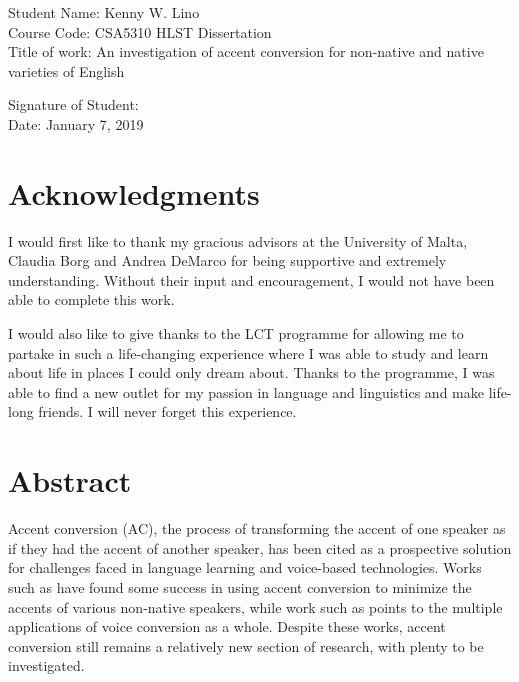 \documentclass
[
    a4paper,
    twoside,
    12pt,
]
{report}
\begin{document}
       \vspace*{1.5cm}
	     Student Name: Kenny W. Lino \\
       Course Code: CSA5310 HLST Dissertation \\
       Title of work: An investigation of accent conversion for non-native and native varieties of English\

       \vspace*{1.0cm}
       Signature of Student: \\

       \vspace*{1.0cm}
       Date: January 7, 2019

\newpage
\section*{Acknowledgments}

I would first like to thank my gracious advisors at the University of
Malta, Claudia Borg and Andrea DeMarco for being supportive and
extremely understanding. Without their input and encouragement, I would
not have been able to complete this work.

I would also like to give thanks to the LCT programme for allowing me to
partake in such a life-changing experience where I was able to study and
learn about life in places I could only dream about. Thanks to the
programme, I was able to find a new outlet for my passion in language
and linguistics and make life-long friends. I will never forget this
experience.

\newpage
\section*{Abstract}

Accent conversion (AC), the process of transforming the accent of one
speaker as if they had the accent of another speaker, has been cited as
a prospective solution for challenges faced in language learning and
voice-based technologies. Works such as \textcite{aryal2014, zhao2018a}
have found some success in using accent conversion to minimize the
accents of various non-native speakers, while work such as
\textcite{mohammadi2017} points to the multiple applications of voice
conversion as a whole. Despite these works, accent conversion still
remains a relatively new section of research, with plenty to be
investigated.
\end{document}
